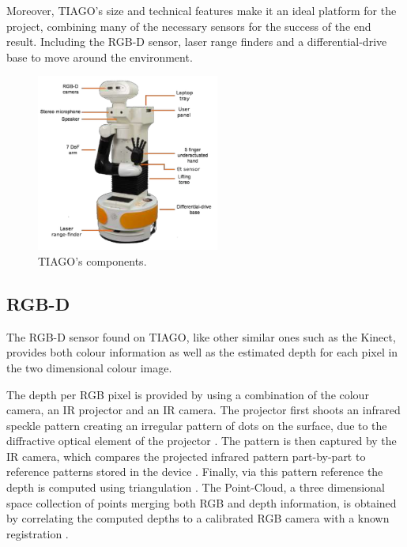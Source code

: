 Moreover, TIAGO's size and technical features make it an ideal platform for the project, combining many of the necessary sensors for the success of the end result. Including the RGB-D sensor, laser range finders and a differential-drive base to move around the environment.

\begin{figure}[H]
  \begin{center}
  	\includegraphics[width=6cm]{images/tiago_components.png}
  \end{center}
  \caption{TIAGO's components\protect\footnotemark.}
\end{figure}

\subsection{RGB-D}

The RGB-D sensor found on TIAGO, like other similar ones such as the Kinect, provides both colour information as well as the estimated depth for each pixel in the two dimensional colour image.

The depth per RGB pixel is provided by using a combination of the colour camera, an IR projector and an IR camera. The projector first shoots an infrared speckle pattern creating an irregular pattern of dots on the surface, due to the diffractive optical element of the projector \cite{paper:RGB-D}. The pattern is then captured by the IR camera, which compares the projected infrared pattern part-by-part to reference patterns stored in the device \cite{paper:RGB-D}. Finally, via this pattern reference the depth is computed using triangulation \cite{paper:RGB-D}. The Point-Cloud, a three dimensional space collection of points merging both RGB and depth information, is obtained by correlating the computed depths to a calibrated RGB camera with a known registration \cite{paper:RGB-D}.

